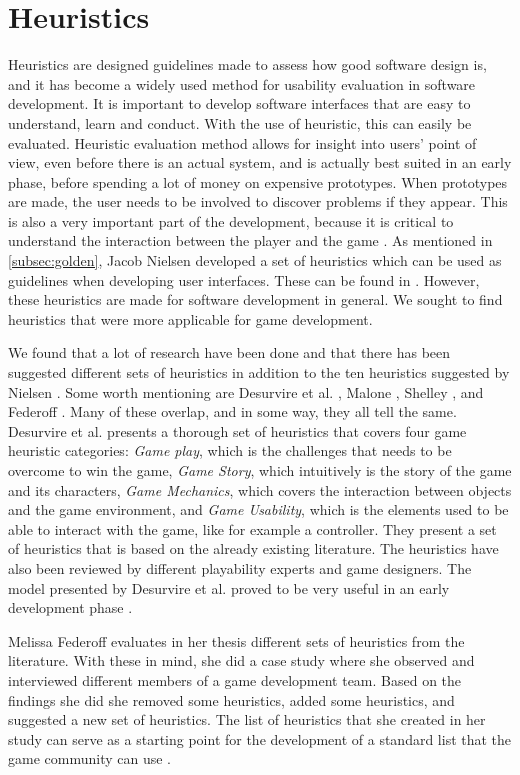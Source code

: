 \section{Heuristics}
\label{sec:heur}
Heuristics are designed guidelines made to assess how good software design is, and it has become a widely used method for usability evaluation in software development. It is important to develop software interfaces that are easy to understand, learn and conduct. With the use of heuristic, this can easily be evaluated. Heuristic evaluation method allows for insight into users' point of view, even before there is an actual system, and is actually best suited in an early phase, before spending a lot of money on expensive prototypes.  When prototypes are made, the user needs to be involved to discover problems if they appear. This is also a very important part of the development, because it is critical to understand the interaction between the player and the game \cite{desurvire}. As mentioned in \ref{subsec:golden}, Jacob Nielsen developed a set of heuristics which can be used as guidelines when developing user interfaces. These can be found in \cite{nielsen2005ten}. However, these heuristics are made for software development in general. We sought to find heuristics that were more applicable for game development. 

We found that a lot of research have been done and that there has been suggested different sets of heuristics in addition to the ten heuristics suggested by Nielsen \cite{nielsen2005ten}. Some worth mentioning are Desurvire et al. \cite{desurvire}, Malone \cite{malone}, Shelley \cite{shelley}, and Federoff \cite{federoff}. Many of these overlap, and in some way, they all tell the same.  Desurvire et al. presents a thorough set of heuristics that covers four game heuristic categories:  \emph{Game play}, which is the challenges that needs to be overcome to win the game, \emph{Game Story}, which intuitively is the story of the game and its characters, \emph{Game Mechanics}, which covers the interaction between objects and the game environment, and  \emph{Game Usability}, which is the elements used to be able to interact with the game, like for example a controller. They present a set of heuristics that is based on the already existing literature. The heuristics have also been reviewed by different playability experts and game designers. The model presented by Desurvire et al. proved to be very useful in an early development phase \cite{desurvire}.

Melissa Federoff evaluates in her thesis different sets of heuristics from the literature. With these in mind, she did a case study where she observed and interviewed different members of a game development team. Based on the findings she did she removed some heuristics, added some heuristics, and  suggested a new set of heuristics. The list of heuristics that she created in her study can serve as a starting point for the development of a standard list that the game community can use  \cite{federoff}. 

